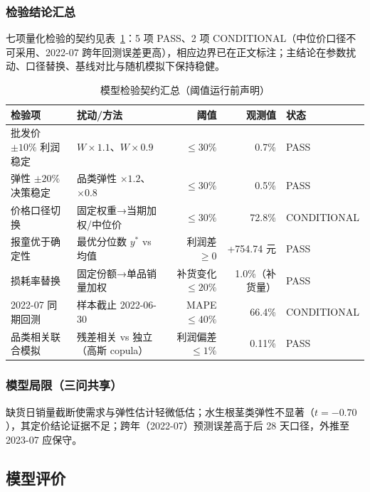 \subsubsection{检验结论汇总}

七项量化检验的契约见表~\ref{tab:summary}：5 项 PASS、2 项 CONDITIONAL（中位价口径不可采用、2022-07 跨年回测误差更高），相应边界已在正文标注；主结论在参数扰动、口径替换、基线对比与随机模拟下保持稳健。

\begin{table}[htbp]
\centering
\caption{模型检验契约汇总（阈值运行前声明）}
\label{tab:summary}
\begin{tabular}{l l r r l}
\toprule
检验项 & 扰动/方法 & 阈值 & 观测值 & 状态 \\
\midrule
批发价 $\pm10\%$ 利润稳定 & $W\times1.1$、$W\times0.9$ & $\le30\%$ & 0.7\% & PASS \\
弹性 $\pm20\%$ 决策稳定 & 品类弹性 $\times1.2$、$\times0.8$ & $\le30\%$ & 0.5\% & PASS \\
价格口径切换 & 固定权重→当期加权/中位价 & $\le30\%$ & 72.8\% & CONDITIONAL \\
报童优于确定性 & 最优分位数 $y^*$ vs 均值 & 利润差 $\ge0$ & +754.74 元 & PASS \\
损耗率替换 & 固定份额→单品销量加权 & 补货变化 $\le20\%$ & 1.0\%（补货量） & PASS \\
2022-07 同期回测 & 样本截止 2022-06-30 & MAPE $\le40\%$ & 66.4\% & CONDITIONAL \\
品类相关联合模拟 & 残差相关 vs 独立（高斯 copula） & 利润偏差 $\le1\%$ & 0.11\% & PASS \\
\bottomrule
\end{tabular}
\end{table}

\subsubsection{模型局限（三问共享）}

缺货日销量截断使需求与弹性估计轻微低估；水生根茎类弹性不显著（$t=-0.70$），其定价结论证据不足；跨年（2022-07）预测误差高于后 28 天口径，外推至 2023-07 应保守。

\subsection{模型评价}

